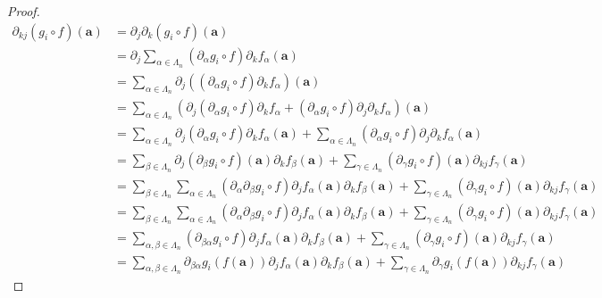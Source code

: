 \documentclass[dvipdfmx]{jsarticle}
\begin{document}
\begin{proof}
\begin{align*}
\partial_{kj}\left( g_{i} \circ f \right)\left( \mathbf{a} \right) &= \partial_{j}\partial_{k}\left( g_{i} \circ f \right)\left( \mathbf{a} \right)\\
&= \partial_{j}\sum_{\alpha \in \varLambda_{n}} {\left( \partial_{\alpha}g_{i} \circ f \right)\partial_{k}f_{\alpha}}\left( \mathbf{a} \right)\\
&= \sum_{\alpha \in \varLambda_{n}} {\partial_{j}\left( \left( \partial_{\alpha}g_{i} \circ f \right)\partial_{k}f_{\alpha} \right)}\left( \mathbf{a} \right)\\
&= \sum_{\alpha \in \varLambda_{n}} \left( \partial_{j}\left( \partial_{\alpha}g_{i} \circ f \right)\partial_{k}f_{\alpha} + \left( \partial_{\alpha}g_{i} \circ f \right)\partial_{j}\partial_{k}f_{\alpha} \right)\left( \mathbf{a} \right)\\
&= \sum_{\alpha \in \varLambda_{n}} {\partial_{j}\left( \partial_{\alpha}g_{i} \circ f \right)\partial_{k}f_{\alpha}}\left( \mathbf{a} \right) + \sum_{\alpha \in \varLambda_{n}} {\left( \partial_{\alpha}g_{i} \circ f \right)\partial_{j}\partial_{k}f_{\alpha}}\left( \mathbf{a} \right)\\
&= \sum_{\beta \in \varLambda_{n}} {\partial_{j}\left( \partial_{\beta}g_{i} \circ f \right)\left( \mathbf{a} \right)\partial_{k}f_{\beta}\left( \mathbf{a} \right)} + \sum_{\gamma \in \varLambda_{n}} {\left( \partial_{\gamma}g_{i} \circ f \right)\left( \mathbf{a} \right)\partial_{kj}f_{\gamma}\left( \mathbf{a} \right)}\\
&= \sum_{\beta \in \varLambda_{n}} {\sum_{\alpha \in \varLambda_{n}} {\left( \partial_{\alpha}\partial_{\beta}g_{i} \circ f \right)\partial_{j}f_{\alpha}}\left( \mathbf{a} \right)\partial_{k}f_{\beta}\left( \mathbf{a} \right)} + \sum_{\gamma \in \varLambda_{n}} {\left( \partial_{\gamma}g_{i} \circ f \right)\left( \mathbf{a} \right)\partial_{kj}f_{\gamma}\left( \mathbf{a} \right)}\\
&= \sum_{\beta \in \varLambda_{n}} {\sum_{\alpha \in \varLambda_{n}} {\left( \partial_{\alpha}\partial_{\beta}g_{i} \circ f \right)\partial_{j}f_{\alpha}}\left( \mathbf{a} \right)\partial_{k}f_{\beta}\left( \mathbf{a} \right)} + \sum_{\gamma \in \varLambda_{n}} {\left( \partial_{\gamma}g_{i} \circ f \right)\left( \mathbf{a} \right)\partial_{kj}f_{\gamma}\left( \mathbf{a} \right)}\\
&= \sum_{\alpha,\beta \in \varLambda_{n}} {\left( \partial_{\beta\alpha}g_{i} \circ f \right)\partial_{j}f_{\alpha}\left( \mathbf{a} \right)\partial_{k}f_{\beta}\left( \mathbf{a} \right)} + \sum_{\gamma \in \varLambda_{n}} {\left( \partial_{\gamma}g_{i} \circ f \right)\left( \mathbf{a} \right)\partial_{kj}f_{\gamma}\left( \mathbf{a} \right)}\\
&= \sum_{\alpha,\beta \in \varLambda_{n}} {\partial_{\beta\alpha}g_{i}\left( f\left( \mathbf{a} \right) \right)\partial_{j}f_{\alpha}\left( \mathbf{a} \right)\partial_{k}f_{\beta}\left( \mathbf{a} \right)} + \sum_{\gamma \in \varLambda_{n}} {\partial_{\gamma}g_{i}\left( f\left( \mathbf{a} \right) \right)\partial_{kj}f_{\gamma}\left( \mathbf{a} \right)}
\end{align*}
\end{proof}
\end{document}
